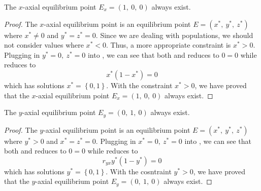 \begin{theorem}\label{thm:eq-axial-x-exist}
    The $x$-axial equilibrium point $E_x=\left(1,\ 0,\ 0\right)$ always exist.
\end{theorem}
\begin{proof}
    The $x$-axial equilibrium point is an equilibrium point $E=\left(x^*,\ y^*,\ z^*\right)$ where $x^*\neq0$ and $y^*=z^*=0$. Since we are dealing with populations, we should not consider values where $x^*<0$. Thus, a more appropriate constraint is $x^*>0$. Plugging in $y^*=0,\ z^*=0$ into , we can see that both  and  reduces to $0=0$ while  reduces to
    \begin{equation*}
        x^*\left(1-x^*\right)=0
    \end{equation*}
    which has solutions $x^*=\left\{0,1\right\}$. With the constraint $x^*>0$, we have proved that the $x$-axial equilibrium point $E_x=\left(1,\ 0,\ 0\right)$ always exist.
\end{proof}

\begin{theorem}\label{thm:eq-axial-y-exist}
    The $y$-axial equilibrium point $E_y=\left(0,\ 1,\ 0\right)$ always exist.
\end{theorem}
\begin{proof}
    The $y$-axial equilibrium point is an equilibrium point $E=\left(x^*,\ y^*,\ z^*\right)$ where $y^*>0$ and $x^*=z^*=0$. Plugging in $x^*=0,\ z^*=0$ into , we can see that both  and  reduces to $0=0$ while  reduces to
    \begin{equation*}
        r_{yx}y^*\left(1-y^*\right)=0
    \end{equation*}
    which has solutions $y^*=\left\{0,1\right\}$. With the cosntraint $y^*>0$, we have proved that the $y$-axial equilibrium point $E_y=\left(0,\ 1,\ 0\right)$ always exist.
\end{proof}


